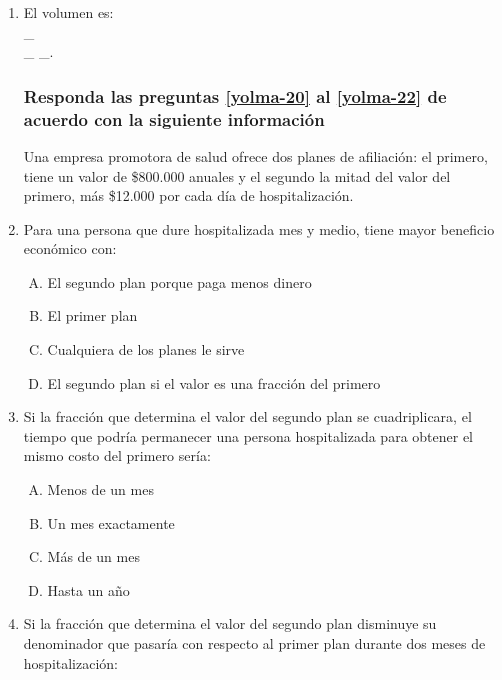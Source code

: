 \begin{enumerate}

\item El volumen es: \label{yolma-19}\hrulefill\\
\_\hrulefill\\
\_\hrulefill
\_\hrulefill.


\subsubsection*{Responda las preguntas \ref{yolma-20} al \ref{yolma-22} de acuerdo con la siguiente información}

Una empresa promotora de salud ofrece dos planes de afiliación: el primero, tiene un valor de \$800.000 anuales y el segundo la mitad del valor del primero, más \$12.000 por cada día de hospitalización.

\item Para una persona que dure hospitalizada mes y medio, tiene mayor beneficio económico con: \label{yolma-20}\\

\begin{enumerate}[(A)]
\item  El segundo plan porque paga menos dinero
\item El primer plan
\item Cualquiera de los planes le sirve
\item El segundo plan si el valor es una fracción del primero
\end{enumerate}


\item Si la fracción que determina el valor del segundo plan se cuadriplicara, el tiempo que podría permanecer una persona hospitalizada para obtener el mismo costo del primero sería: \label{yolma-21}\\

\begin{enumerate}[(A)]
\item  Menos de un mes
\item Un mes exactamente
\item Más de un mes
\item Hasta un año
\end{enumerate}

\newpage
\item Si la fracción que determina el valor del segundo plan disminuye su denominador que pasaría con respecto al primer plan durante dos meses de hospitalización: \label{yolma-22}\\


\end{enumerate}
